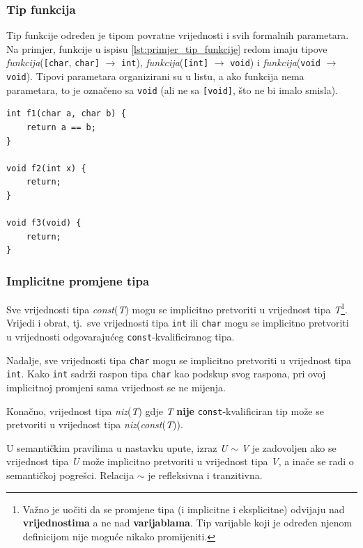 \documentclass[times, 12pt, utf8]{book}
\begin{document}
\subsubsection{Tip funkcija}
Tip funkcije određen je tipom povratne vrijednosti i svih formalnih parametara.
Na primjer, funkcije u ispisu \ref{lst:primjer_tip_funkcije} redom imaju tipove \emph{funkcija}(\verb|[char|, \verb|char]| \(\to\) \verb|int|), \emph{funkcija}(\verb|[int]| \(\to\) \verb|void|) i \emph{funkcija}(\verb|void| \(\to\) \verb|void|).
Tipovi parametara organizirani su u listu, a ako funkcija nema parametara, to je označeno sa \verb|void| (ali ne sa \verb|[void]|, što ne bi imalo smisla).

\begin{lstlisting}[caption={Primjer jednostavne funkcije.},label=lst:primjer_tip_funkcije]
int f1(char a, char b) {
    return a == b;
}

void f2(int x) {
    return;
}

void f3(void) {
    return;
}
\end{lstlisting}

\subsubsection{Implicitne promjene tipa}
Sve vrijednosti tipa \emph{const}(\emph{T}) mogu se implicitno pretvoriti u vrijednost tipa \emph{T}\footnote{Važno je uočiti da se promjene tipa (i implicitne i eksplicitne) odvijaju nad \textbf{vrijednostima} a ne nad \textbf{varijablama}. Tip varijable koji je određen njenom definicijom nije moguće nikako promijeniti.}.
Vrijedi i obrat, tj.~sve vrijednosti tipa \verb|int| ili \verb|char| mogu se implicitno pretvoriti u vrijednosti odgovarajućeg \verb|const|-kvalificiranog tipa.

Nadalje, sve vrijednosti tipa \verb|char| mogu se implicitno pretvoriti u vrijednost tipa \verb|int|.
Kako \verb|int| sadrži raspon tipa \verb|char| kao podskup svog raspona, pri ovoj implicitnoj promjeni sama vrijednost se ne mijenja.

Konačno, vrijednost tipa \emph{niz}(\emph{T}) gdje \emph{T} \textbf{nije} \verb|const|-kvalificiran tip može se pretvoriti u vrijednost tipa \emph{niz}(\emph{const}(\emph{T})).

U semantičkim pravilima u nastavku upute, izraz \emph{U} \(\sim\) \emph{V} je zadovoljen ako se vrijednost tipa \emph{U} može implicitno pretvoriti u vrijednost tipa \emph{V}, a inače se radi o semantičkoj pogrešci.
Relacija \(\sim\) je refleksivna i tranzitivna.
\end{document}

